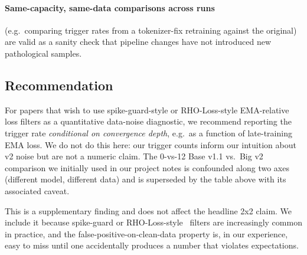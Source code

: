 \paragraph{Same-capacity, same-data comparisons across runs} (e.g.\ comparing trigger rates from a tokenizer-fix retraining against the original) are valid as a sanity check that pipeline changes have not introduced new pathological samples.

\subsection{Recommendation}

For papers that wish to use spike-guard-style or RHO-Loss-style EMA-relative loss filters as a quantitative data-noise diagnostic, we recommend reporting the trigger rate \emph{conditional on convergence depth}, e.g.\ as a function of late-training EMA loss. We do not do this here: our trigger counts inform our intuition about v2 noise but are not a numeric claim. The 0-vs-12 Base v1.1 vs.\ Big v2 comparison we initially used in our project notes is confounded along two axes (different model, different data) and is superseded by the table above with its associated caveat.

This is a supplementary finding and does not affect the headline 2x2 claim. We include it because spike-guard or RHO-Loss-style~\cite{mindermann2022prioritized} filters are increasingly common in practice, and the false-positive-on-clean-data property is, in our experience, easy to miss until one accidentally produces a number that violates expectations.
